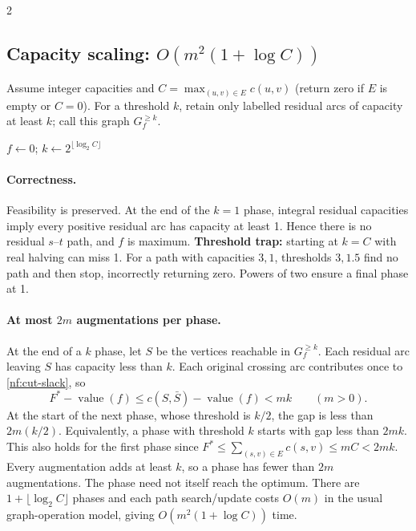 \documentclass[8pt]{extarticle}
\theoremstyle{definition}
\begin{document}
\begin{multicols*}{2}
\subsection{Capacity scaling: \texorpdfstring{$O(m^2(1+\log C))$}{O(m squared log C)}}\label{nf:scaling}
Assume integer capacities and $C=\max_{(u,v)\in E}c(u,v)$
(return zero if $E$ is empty or
$C=0$). For a threshold $k$, retain only labelled residual arcs of capacity
at least $k$; call this graph $G_f^{\ge k}$.


\begin{algorithm}[H]
\caption{Capacity scaling: augment only through residual capacities $\ge k$}
$f\gets0$; $k\gets2^{\lfloor\log_2 C\rfloor}$\;
\;
\end{algorithm}
\paragraph{Correctness.}
Feasibility is preserved. At the end of the $k=1$ phase, integral residual
capacities imply every positive residual arc has capacity at least 1. Hence
there is no residual $s$--$t$ path, and $f$ is maximum.
\textbf{Threshold trap:} starting at $k=C$ with real halving can miss 1.
For a path with capacities $3,1$, thresholds $3,1.5$ find no path and then
stop, incorrectly returning zero. Powers of two ensure a final phase at 1.

\paragraph{At most $2m$ augmentations per phase.}
At the end of a $k$ phase, let $S$ be the vertices reachable in
$G_f^{\ge k}$. Each residual arc leaving $S$ has capacity less than $k$.
Each original crossing arc contributes once to \eqref{nf:cut-slack}, so
\[
 F^*-\operatorname{value}(f)\le c(S,\bar S)-\operatorname{value}(f)<mk\qquad(m>0).
\]
At the start of the next phase, whose threshold is $k/2$, the gap is less
than $2m(k/2)$. Equivalently, a phase with threshold $k$ starts with gap
less than $2mk$. This also holds for the first phase since
$F^*\le\sum_{(s,v)\in E}c(s,v)\le mC<2mk$.
Every augmentation adds at least $k$, so a phase has fewer than $2m$
augmentations. The phase need not itself reach the optimum.
There are $1+\lfloor\log_2 C\rfloor$ phases and each path search/update costs
$O(m)$ in the usual graph-operation model, giving $O(m^2(1+\log C))$ time.


\end{multicols*}
\end{document}
